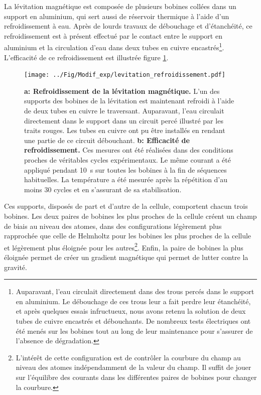 La lévitation magnétique est composée de plusieurs bobines collées dans un support en aluminium, qui sert aussi de réservoir thermique à l'aide d'un refroidissement à eau. Après de lourds travaux de débouchage et d'étanchéité, ce refroidissement est à présent effectué par le contact entre le support en aluminium et la circulation d'eau dans deux tubes en cuivre encastrés\footnote{Auparavant, l'eau circulait directement dans des trous percés dans le support en aluminium. Le débouchage de ces trous leur a fait perdre leur étanchéité, et après quelques essais infructueux, nous avons retenu la solution de deux tubes de cuivre encastrés et débouchants. De nombreux tests électriques ont été menés sur les bobines tout au long de leur maintenance pour s'assurer de l'absence de dégradation.}. L'efficacité de ce refroidissement est illustrée figure \ref{fig:refroidissement_levitation}.

\begin{figure}
\centering
\texttt{[image: ../Fig/Modif\_exp/levitation\_refroidissement.pdf]}
\caption{\textbf{a: Refroidissement de la lévitation magnétique.} L'un des supports des bobines de la lévitation est maintenant refroidi à l'aide de deux tubes en cuivre le traversant. Auparavant, l'eau circulait directement dans le support dans un circuit percé illustré par les traits rouges. Les tubes en cuivre ont pu être installés en rendant une partie de ce circuit débouchant. \textbf{b: Efficacité de refroidissement.} Ces mesures ont été réalisées dans des conditions proches de véritables cycles expérimentaux. Le même courant a été appliqué pendant \SI{10}{\second} sur toutes les bobines à la fin de séquences habituelles. La température a été mesurée après la répétition d'au moins 30 cycles et en s'assurant de sa stabilisation.}
\label{fig:refroidissement_levitation}
\end{figure}


Ces supports, disposés de part et d'autre de la cellule, comportent chacun trois bobines. Les deux paires de bobines les plus proches de la cellule créent un champ de biais au niveau des atomes, dans des configurations légèrement plus rapprochée que celle de Helmholtz pour les bobines les plus proches de la cellule et légèrement plus éloignée pour les autres\footnote{L'intérêt de cette configuration est de contrôler la courbure du champ au niveau des atomes indépendamment de la valeur du champ. Il suffit de jouer sur l'équilibre des courants dans les différentes paires de bobines pour changer la courbure.}. Enfin, la paire de bobines la plus éloignée permet de créer un gradient magnétique qui permet de lutter contre la gravité.

